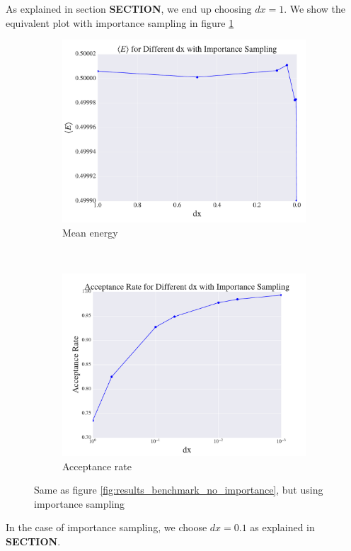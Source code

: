 \documentclass[a4paper, 10pt]{article}
\begin{document}
As explained in section \textbf{SECTION}, we end up choosing $dx=1$. We show the equivalent plot with importance sampling in figure \ref{fig:results_benchmark_importance}
\begin{figure}[ht!]
	\centering
	\begin{subfigure}[b]{0.8\textwidth}
		\centering
		\includegraphics[width=\textwidth]{../Results/E_v_dx_importance.pdf}
		\caption{Mean energy}
	\end{subfigure}
	~
	\begin{subfigure}[b]{0.8\textwidth}
		\centering
		\includegraphics[width=\textwidth]{../Results/AC_importance.pdf}
		\caption{Acceptance rate}
	\end{subfigure}
	\caption{Same as figure \ref{fig:results_benchmark_no_importance}, but using importance sampling}\label{fig:results_benchmark_importance}
\end{figure}
In the case of importance sampling, we choose $dx=0.1$ as explained in \textbf{SECTION}.
\end{document}
